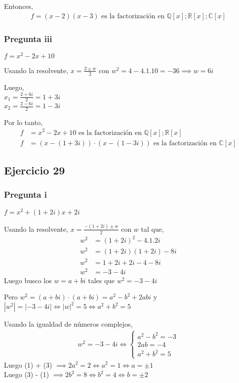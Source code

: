 Entonces,
\begin{align*}
    f = (x-2)(x-3) \text{ es la factorización en } \mathbb{Q}[x]; \mathbb{R}[x]; \mathbb{C}[x]
\end{align*}

\subsubsection{Pregunta iii}
$ f = x^2 - 2x + 10 $

Usando la resolvente, $ x = \frac{2 \pm w}{2} $ con $ w^2 = 4-4.1.10 = -36 \implies w = 6i$

Luego, \\
$ x_1 = \frac{2+6i}{2} = 1+3i $ \\
$ x_2 = \frac{2-6i}{2} = 1-3i $ 

Por lo tanto,
\begin{align*}
    f &= x^2 - 2x + 10 \text{ es la factorización en } \mathbb{Q}[x]; \mathbb{R}[x] \\
    f &= (x-(1+3i))\cdot (x-(1-3i)) \text{ es la factorización en } \mathbb{C}[x]
\end{align*}

\subsection{Ejercicio 29}
\subsubsection{Pregunta i}

$ f = x^2 + (1+2i)x + 2i $

Usando la resolvente, $ x = \frac{-(1+2i) \pm w}{2} $ con $w$ tal que,
\begin{align*}
    w^2 &= (1+2i)^2 - 4.1.2i \\
    w^2 &= (1+2i)(1+2i) - 8i \\
    w^2 &= 1+2i+2i-4 - 8i \\
    w^2 &= -3-4i
\end{align*}
Luego busco los $ w = a+bi $ tales que $ w^2 = -3-4i $

Pero $ w^2 = (a+bi) \cdot (a+bi) = a^2 - b^2 + 2abi $ y \\
$ |w^2| = |-3-4i| \iff |w|^2 = 5 \iff a^2 + b^2 = 5$

Usando la igualdad de números complejos,
\begin{align*}
    w^2 = -3-4i \iff \begin{cases}
        a^2 - b^2 = -3 \\
        2ab = -4 \\
        a^2 + b^2 = 5
    \end{cases}
\end{align*}
Luego (1) + (3) $ \implies 2a^2 = 2 \iff a^2 = 1 \iff a = \pm 1 $ \\
Luego (3) - (1) $ \implies 2b^2 = 8 \iff b^2 = 4 \iff b = \pm 2 $ \\

